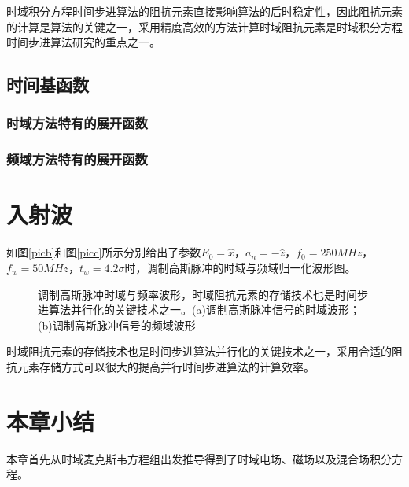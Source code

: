 时域积分方程时间步进算法的阻抗元素直接影响算法的后时稳定性，因此阻抗元素的计算是算法的关键之一，采用精度高效的方法计算时域阻抗元素是时域积分方程时间步进算法研究的重点之一。


\subsection{时间基函数}

\subsubsection{时域方法特有的展开函数}

\subsubsection{频域方法特有的展开函数}

\section{入射波}

如图\ref{picb}和图\ref{picc}所示分别给出了参数$E_0=\hat{x}$，$a_n=-\hat{z}$，$f_0=250MHz$，$f_w=50MHz$，$t_w=4.2\sigma$时，调制高斯脉冲的时域与频域归一化波形图。

\begin{figure}[h]
\caption{调制高斯脉冲时域与频率波形，时域阻抗元素的存储技术也是时间步进算法并行化的关键技术之一。(a)调制高斯脉冲信号的时域波形；(b)调制高斯脉冲信号的频域波形}
\label{fig1}
\end{figure}

时域阻抗元素的存储技术也是时间步进算法并行化的关键技术之一，采用合适的阻抗元素存储方式可以很大的提高并行时间步进算法的计算效率。

\section{本章小结}
本章首先从时域麦克斯韦方程组出发推导得到了时域电场、磁场以及混合场积分方程。
